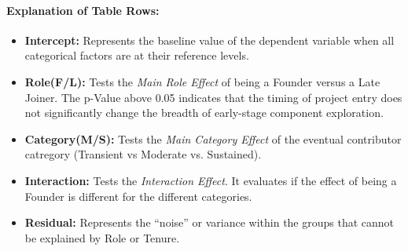 \paragraph{Explanation of Table Rows:}
\begin{itemize}
    \item \textbf{Intercept:} Represents the baseline value of the dependent variable when all categorical factors are at their reference levels.
    \item \textbf{Role(F/L):} Tests the \textit{Main Role Effect} of being a Founder versus a Late Joiner. The p-Value above 0.05 indicates that the timing of project entry does not significantly change the breadth of early-stage component exploration.
    \item \textbf{Category(M/S):} Tests the \textit{Main Category Effect} of the eventual contributor catregory (Transient vs Moderate vs. Sustained). 
    \item \textbf{Interaction:} Tests the \textit{Interaction Effect}. It evaluates if the effect of being a Founder is different for the different categories. 
    \item \textbf{Residual:} Represents the ``noise'' or variance within the groups that cannot be explained by Role or Tenure. 
\end{itemize}
